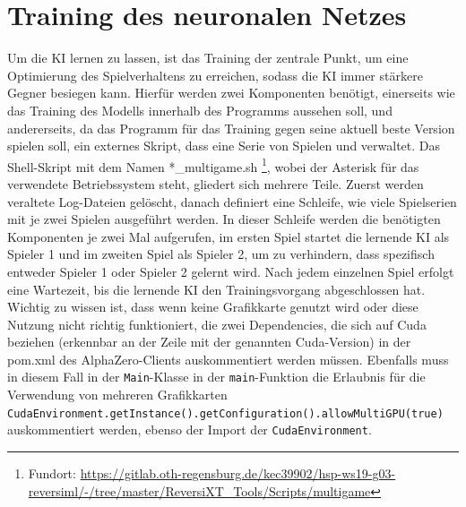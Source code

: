\documentclass[12pt,a4paper]{article}
\begin{document}
\section{Training des neuronalen Netzes}
Um die KI lernen zu lassen, ist das Training der zentrale Punkt, um eine Optimierung des Spielverhaltens zu erreichen, sodass die KI immer stärkere Gegner besiegen kann.  Hierfür werden zwei Komponenten benötigt, einerseits wie das Training des Modells innerhalb des Programms aussehen soll, und andererseits, da das Programm für das Training gegen seine aktuell beste Version spielen soll, ein externes Skript, dass eine Serie von Spielen und verwaltet. Das Shell-Skript mit dem Namen *\_multigame.sh \footnote{Fundort: \url{https://gitlab.oth-regensburg.de/kec39902/hsp-ws19-g03-reversiml/-/tree/master/ReversiXT_Tools/Scripts/multigame}}, wobei der Asterisk für das verwendete Betriebssystem steht, gliedert sich mehrere Teile. Zuerst werden veraltete Log-Dateien gelöscht, danach definiert eine Schleife, wie viele Spielserien mit je zwei Spielen ausgeführt werden. In dieser Schleife werden die benötigten Komponenten je zwei Mal aufgerufen, im ersten Spiel startet die lernende KI als Spieler 1 und im zweiten Spiel als Spieler 2, um zu verhindern, dass spezifisch entweder Spieler 1 oder Spieler 2 gelernt wird. Nach jedem einzelnen Spiel erfolgt eine Wartezeit, bis die lernende KI den Trainingsvorgang abgeschlossen hat. Wichtig zu wissen ist, dass wenn keine Grafikkarte genutzt wird oder diese Nutzung nicht richtig funktioniert, die zwei Dependencies, die sich auf Cuda beziehen (erkennbar an der Zeile mit der genannten Cuda-Version) in der pom.xml des AlphaZero-Clients auskommentiert werden müssen. Ebenfalls muss in diesem Fall in der \texttt{Main}-Klasse in der \texttt{main}-Funktion die Erlaubnis für die Verwendung von mehreren Grafikkarten \texttt{CudaEnvironment.getInstance().getConfiguration().allowMultiGPU(true)} auskommentiert werden, ebenso der Import der \texttt{CudaEnvironment}. \\
\end{document}

